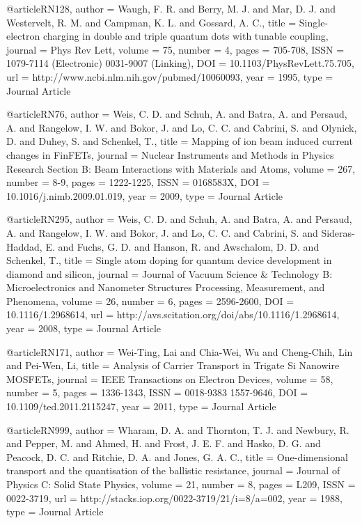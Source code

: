 @article{RN128,
   author = {Waugh, F. R. and Berry, M. J. and Mar, D. J. and Westervelt, R. M. and Campman, K. L. and Gossard, A. C.},
   title = {Single-electron charging in double and triple quantum dots with tunable coupling},
   journal = {Phys Rev Lett},
   volume = {75},
   number = {4},
   pages = {705-708},
   ISSN = {1079-7114 (Electronic)
0031-9007 (Linking)},
   DOI = {10.1103/PhysRevLett.75.705},
   url = {http://www.ncbi.nlm.nih.gov/pubmed/10060093},
   year = {1995},
   type = {Journal Article}
}

@article{RN76,
   author = {Weis, C. D. and Schuh, A. and Batra, A. and Persaud, A. and Rangelow, I. W. and Bokor, J. and Lo, C. C. and Cabrini, S. and Olynick, D. and Duhey, S. and Schenkel, T.},
   title = {Mapping of ion beam induced current changes in FinFETs},
   journal = {Nuclear Instruments and Methods in Physics Research Section B: Beam Interactions with Materials and Atoms},
   volume = {267},
   number = {8-9},
   pages = {1222-1225},
   ISSN = {0168583X},
   DOI = {10.1016/j.nimb.2009.01.019},
   year = {2009},
   type = {Journal Article}
}

@article{RN295,
   author = {Weis, C. D. and Schuh, A. and Batra, A. and Persaud, A. and Rangelow, I. W. and Bokor, J. and Lo, C. C. and Cabrini, S. and Sideras-Haddad, E. and Fuchs, G. D. and Hanson, R. and Awschalom, D. D. and Schenkel, T.},
   title = {Single atom doping for quantum device development in diamond and silicon},
   journal = {Journal of Vacuum Science & Technology B: Microelectronics and Nanometer Structures Processing, Measurement, and Phenomena},
   volume = {26},
   number = {6},
   pages = {2596-2600},
   DOI = {10.1116/1.2968614},
   url = {http://avs.scitation.org/doi/abs/10.1116/1.2968614},
   year = {2008},
   type = {Journal Article}
}

@article{RN171,
   author = {Wei-Ting, Lai and Chia-Wei, Wu and Cheng-Chih, Lin and Pei-Wen, Li},
   title = {Analysis of Carrier Transport in Trigate Si Nanowire MOSFETs},
   journal = {IEEE Transactions on Electron Devices},
   volume = {58},
   number = {5},
   pages = {1336-1343},
   ISSN = {0018-9383
1557-9646},
   DOI = {10.1109/ted.2011.2115247},
   year = {2011},
   type = {Journal Article}
}

@article{RN999,
   author = {Wharam, D. A. and Thornton, T. J. and Newbury, R. and Pepper, M. and Ahmed, H. and Frost, J. E. F. and Hasko, D. G. and Peacock, D. C. and Ritchie, D. A. and Jones, G. A. C.},
   title = {One-dimensional transport and the quantisation of the ballistic resistance},
   journal = {Journal of Physics C: Solid State Physics},
   volume = {21},
   number = {8},
   pages = {L209},
   ISSN = {0022-3719},
   url = {http://stacks.iop.org/0022-3719/21/i=8/a=002},
   year = {1988},
   type = {Journal Article}
}

